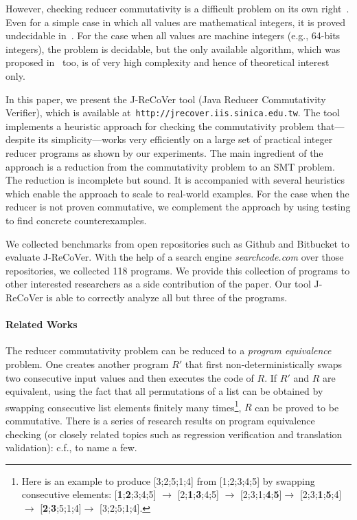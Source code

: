 \documentclass{llncs}
\begin{document}
However, checking reducer commutativity is a difficult problem on its own
right~\cite{ChenHSW15,ChenSW16,ChenLTW17}. Even for a simple case in which all
values are mathematical integers, it is proved undecidable in~\cite{ChenHSW15}.
For the case when all values are machine integers (e.g., 64-bits integers), the
problem is decidable, but the only available algorithm, which was proposed
in~\cite{ChenHSW15} too, is of very high complexity and hence of theoretical
interest only.

In this paper, we present the J-ReCoVer tool (Java Reducer Commutativity
Verifier), which is available at~\verb|http://jrecover.iis.sinica.edu.tw|. The
tool implements a heuristic approach for checking the commutativity problem
that---despite its simplicity---works very efficiently on a large set of
practical integer reducer programs as shown by our experiments. The main
ingredient of the approach is a reduction from the commutativity problem to an
SMT problem. The reduction is incomplete but sound. It is accompanied with
several heuristics which enable the approach to scale to real-world examples.
For the case when the reducer is not proven commutative, we complement the
approach by using testing to find concrete counterexamples.

We collected benchmarks from open repositories such as Github and Bitbucket to
evaluate J-ReCoVer. With the help of a search engine \emph{searchcode.com} over
those repositories, we collected 118 programs. We provide this collection of
programs to other interested researchers as a side contribution of the paper.
Our tool J-ReCoVer is able to correctly analyze all but three of the programs.

\paragraph*{Related Works}

The reducer commutativity problem can be reduced to a \emph{program equivalence}
problem. One creates another program $R'$ that first non-deterministically swaps
two consecutive input values and then executes the code of $R$. If $R'$ and $R$
are equivalent, using the fact that all permutations of a list can be obtained
by swapping consecutive list elements finitely many times\footnote{Here is an
example to produce [3;2;5;1;4] from [1;2;3;4;5] by swapping consecutive
elements: [\textbf{1};\textbf{2};3;4;5] $\rightarrow$
[2;\textbf{1};\textbf{3};4;5] $\rightarrow$
[2;3;1;\textbf{4};\textbf{5}]$\rightarrow$
[2;3;\textbf{1};\textbf{5};4]$\rightarrow$
[\textbf{2};\textbf{3};5;1;4]$\rightarrow$ [3;2;5;1;4].}, $R$ can be proved to
be commutative. There is a series of research results on program equivalence
checking (or closely related topics such as regression verification and
translation validation): c.f.,
\cite{Pnueli:1998:TV,fedyukovich2015automated,barthe2011relational,KlebanovRuemmerUlbrich2017}
to name a few. 
\end{document}
